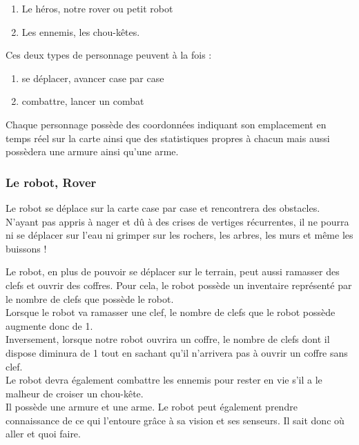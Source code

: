 \documentclass[a4paper 12pts]{article}
\begin{document}
\begin{enumerate}
	\item Le héros, notre rover ou petit robot
	\item Les ennemis, les chou-kêtes.
\end{enumerate}

\vspace{0.5cm}

Ces deux types de personnage peuvent à la fois :

\vspace{0.5cm}

\begin{enumerate}
	\item se déplacer, avancer case par case 
	\item combattre, lancer un combat
\end{enumerate}

\vspace{0.5cm}

Chaque personnage possède des coordonnées indiquant son emplacement en temps réel sur la carte ainsi que des statistiques propres à chacun mais aussi possèdera une armure ainsi qu'une arme.

\newpage
\subsubsection{Le robot, Rover}
\vspace{1cm}

Le robot se déplace sur la carte case par case et rencontrera des obstacles.
N'ayant pas appris à nager et dû à des crises de vertiges récurrentes, il ne pourra ni se déplacer sur l'eau ni grimper sur les rochers,
les arbres, les murs et même les buissons !

Le robot, en plus de pouvoir se déplacer sur le terrain, peut aussi ramasser des clefs et ouvrir des coffres.
Pour cela, le robot possède un inventaire représenté par le nombre de clefs que possède le robot.\\
Lorsque le robot va ramasser une clef, le nombre de clefs que le robot possède augmente donc de 1.\\
Inversement, lorsque notre robot ouvrira un coffre, le nombre de clefs dont il dispose diminura de 1 tout en sachant qu'il n'arrivera pas à ouvrir un coffre sans clef.\\
Le robot devra également combattre les ennemis pour rester en vie s'il a le malheur de croiser un chou-kête.\\
Il possède une armure et une arme.
Le robot peut également prendre connaissance de ce qui l'entoure grâce à sa vision et ses senseurs. Il sait donc où aller et quoi faire.
\end{document}
